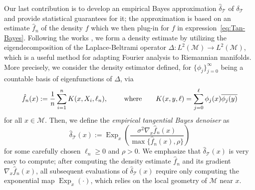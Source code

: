 \documentclass[preprint]{imsart}
\theoremstyle{plain}
\theoremstyle{definition}
\newcommand{\Mcal}{\mathcal{M}}
\newcommand{\T}{\mathcal{T}}
\DeclareMathOperator{\Exp}{Exp}
\begin{document}
    Our last contribution is to develop an empirical Bayes approximation $\hat{\delta}_{\T}$ of $\delta_{\T}$ and provide statistical guarantees for it; the approximation is based on an estimate $\hat{f}_n$ of the density $f$ which we then plug-in for $f$ in expression~\eqref{eq:Tan-Bayes}.
    Following the works \cite{Hendriks1990, InverseProbManifold}, we form a density estimate by utilizing the eigendecomposition of the Laplace-Beltrami operator $\Delta:L^2(\Mcal)\to L^2(\Mcal)$, which is a useful method for adapting Fourier analysis to Riemannian manifolds.
    More precisely, we consider the density estimator defined, for $\{\phi_j\}_{j=0}^{\infty}$ being a countable basis of eigenfunctions of $\Delta$, via
    \begin{equation}
        \hat{f}_n(x) := \frac{1}{n}\sum_{i=1}^{n}K(x,X_i,\ell_n), \qquad \textnormal{ where}\qquad K(x,y,\ell) = \sum_{j=0} ^{\ell}\phi_j(x)\overline{\phi_j(y)}
    \end{equation}
    for all $x\in\Mcal$.
    Then, we define the \textit{empirical tangential Bayes denoiser} as
    \begin{equation}
        \hat{\delta}_{\T}(x):=\Exp_x\left(\frac{\sigma^2\nabla_x \hat{f}_n(x)}{\max\{\hat{f}_n(x),\rho\}}\right)
    \end{equation}
    for some carefully chosen $\ell_n\ge 0$ and $\rho>0$. 
    We emphasize that $\hat{\delta}_{\T}(x)$ is very easy to compute; after computing the density estimate $\hat{f}_n$ and its gradient $\nabla_x\hat{f}_n(x)$, all subsequent evaluations of $\hat{\delta}_{\T}(x)$ require only computing the exponential map $\Exp_x(\cdot)$, which relies on the local geometry of $\Mcal$ near $x$.
\end{document}
